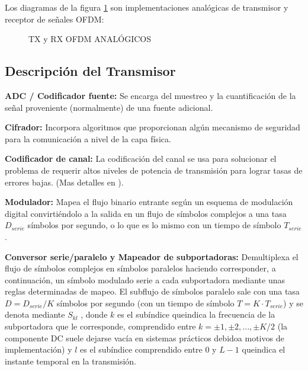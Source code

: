 \documentclass[a4paper,12pt]{report} %
\begin{document}
Los diagramas de la figura \ref{txrx} son implementaciones analógicas de transmisor y receptor de señales OFDM:

\begin{figure}[H]
	\centering
	\caption{TX y RX OFDM ANALÓGICOS}
	\label{txrx}
\end{figure}

\subsection{Descripción del Transmisor}

\textbf{ADC / Codificador fuente:} Se encarga del muestreo y la cuantificación de la señal proveniente (normalmente) de una fuente adicional.

\textbf{Cifrador:} Incorpora algoritmos que proporcionan algún mecanismo de seguridad para la
comunicación a nivel de la capa física.

\textbf{Codificador de canal:} La codificación del canal se usa para solucionar el problema de requerir altos niveles de potencia de transmisión para lograr tasas de errores bajas. (Mas detalles en \cite{tesis}).

\textbf{Modulador:} Mapea el flujo binario entrante según un esquema de modulación digital convirtiéndolo a la salida en un flujo de símbolos complejos a una tasa $D_{serie}$ símbolos por segundo, o lo que es lo mismo con un tiempo de símbolo $T_{serie}$.

\textbf{Conversor serie/paralelo y Mapeador de subportadoras:} Demultiplexa el flujo de símbolos complejos en  símbolos paralelos haciendo corresponder, a continuación, un símbolo modulado serie a cada subportadora mediante
unas reglas determinadas de mapeo. El subflujo
de símbolos paralelo sale con una tasa $D = D_{serie}/K$ símbolos por segundo (con un
tiempo de símbolo $T = K\cdot T_{serie}$) y se denota mediante $S_{kl}$ , donde $k$ es el subíndice queindica la frecuencia de la subportadora que le corresponde, comprendido entre $k = ±1, ±2, ... , ±K/2$ (la componente DC suele dejarse vacía en sistemas prácticos debidoa motivos de implementación) y $l$ es el subíndice comprendido entre 0 y $L-1$ queindica el instante temporal en la transmisión.
\end{document}
